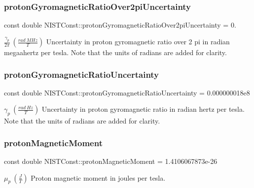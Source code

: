 \subsubsection{\texorpdfstring{proton\+Gyromagnetic\+Ratio\+Over2pi\+Uncertainty}{protonGyromagneticRatioOver2piUncertainty}}
{\footnotesize\ttfamily const double N\+I\+S\+T\+Const\+::proton\+Gyromagnetic\+Ratio\+Over2pi\+Uncertainty = 0.}

$\frac{\gamma_p}{2\pi} \ (\frac{rad\ MHz}{T})$ Uncertainty in proton gyromagnetic ratio over 2 pi in radian megaahertz per tesla. Note that the units of radians are added for clarity. \mbox{\label{group___proton_gaa71b7de7eab3c78be5f0fa7851d284e2}} 
\subsubsection{\texorpdfstring{proton\+Gyromagnetic\+Ratio\+Uncertainty}{protonGyromagneticRatioUncertainty}}
{\footnotesize\ttfamily const double N\+I\+S\+T\+Const\+::proton\+Gyromagnetic\+Ratio\+Uncertainty = 0.\+000000018e8}

$\gamma_p \ (\frac{rad\ Hz}{T})$ Uncertainty in proton gyromagnetic ratio in radian hertz per tesla. Note that the units of radians are added for clarity. \mbox{\label{group___proton_ga931c9d53a62cee8eb68b4e930d0cf5a6}} 
\subsubsection{\texorpdfstring{proton\+Magnetic\+Moment}{protonMagneticMoment}}
{\footnotesize\ttfamily const double N\+I\+S\+T\+Const\+::proton\+Magnetic\+Moment = 1.\+4106067873e-\/26}

$\mu_p \ (\frac{J}{T})$ Proton magnetic moment in joules per tesla. \mbox{\label{group___proton_gab71f8e2de250b48e9bbac602b69999de}} 

